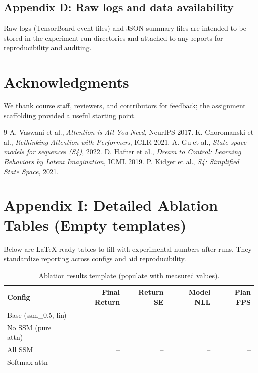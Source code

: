 \documentclass{article}
\begin{document}
\subsection{Appendix D: Raw logs and data availability}
Raw logs (TensorBoard event files) and JSON summary files are intended to be stored in the experiment run directories and attached to any reports for reproducibility and auditing.

\section*{Acknowledgments}
We thank course staff, reviewers, and contributors for feedback; the assignment scaffolding provided a useful starting point.

\begin{thebibliography}{9}
 A. Vaswani et al., \textit{Attention is All You Need}, NeurIPS 2017.
 K. Choromanski et al., \textit{Rethinking Attention with Performers}, ICLR 2021.
 A. Gu et al., \textit{State-space models for sequences (S4)}, 2022.
 D. Hafner et al., \textit{Dream to Control: Learning Behaviors by Latent Imagination}, ICML 2019.
 P. Kidger et al., \textit{S4: Simplified State Space}, 2021.
\end{thebibliography}

\appendix
\section{Appendix I: Detailed Ablation Tables (Empty templates)}
Below are LaTeX-ready tables to fill with experimental numbers after runs. They standardize reporting across configs and aid reproducibility.
\begin{table}[h]
\centering
\begin{tabular}{lrrrr}
\toprule
Config & Final Return & Return SE & Model NLL & Plan FPS \\\midrule
Base (ssm\_0.5, lin) & -- & -- & -- & -- \\
No SSM (pure attn) & -- & -- & -- & -- \\
All SSM & -- & -- & -- & -- \\
Softmax attn & -- & -- & -- & -- \\
\bottomrule
\end{tabular}
\caption{Ablation results template (populate with measured values).}
\end{table}
\end{document}
